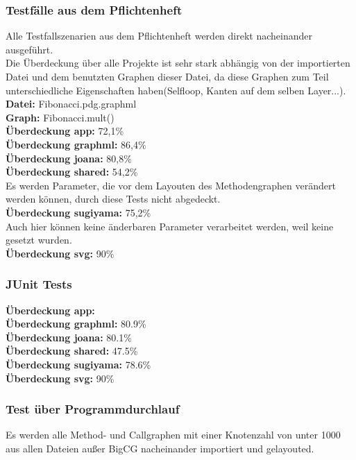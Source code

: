 \subsubsection{Testfälle aus dem Pflichtenheft}
Alle Testfallszenarien aus dem Pflichtenheft werden direkt nacheinander ausgeführt.\\
Die Überdeckung über alle Projekte ist sehr stark abhängig von der importierten Datei und dem benutzten Graphen dieser Datei, da diese Graphen zum Teil unterschiedliche Eigenschaften haben(Selfloop, Kanten auf dem selben Layer...).\\

\textbf{Datei: }Fibonacci.pdg.graphml\\
\textbf{Graph: }Fibonacci.mult()\\
\textbf{Überdeckung app: }72,1\%\\
\textbf{Überdeckung graphml: }86,4\%\\
\textbf{Überdeckung joana: }80,8\%\\
\textbf{Überdeckung shared: }54,2\%\\
Es werden Parameter, die vor dem Layouten des Methodengraphen verändert werden können, durch diese Tests nicht abgedeckt.\\
\textbf{Überdeckung sugiyama: }75,2\%\\
Auch hier können keine änderbaren Parameter verarbeitet werden, weil keine gesetzt wurden.\\
\textbf{Überdeckung svg: }90\%\\
\subsubsection{JUnit Tests}

\textbf{Überdeckung app: }\\
\textbf{Überdeckung graphml: }80.9\%\\
\textbf{Überdeckung joana: }80.1\%\\
\textbf{Überdeckung shared: }47.5\%\\
\textbf{Überdeckung sugiyama: }78.6\%\\
\textbf{Überdeckung svg: }90\%\\

\subsubsection{Test über Programmdurchlauf}
Es werden alle Method- und Callgraphen mit einer Knotenzahl von unter 1000 aus allen Dateien außer BigCG nacheinander importiert und gelayouted.\\


